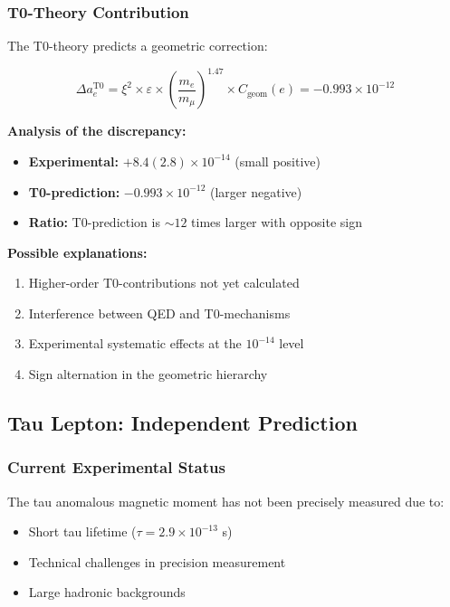 \documentclass[12pt,a4paper]{article}
\numberwithin{equation}{section}
\newcommand{\xipar}{\xi}
\newcommand{\epsilonT}{\varepsilon}
\newcommand{\Cgeom}{C_{\text{geom}}}
\begin{document}
	\subsubsection{T0-Theory Contribution}
	
	The T0-theory predicts a geometric correction:
	
	\begin{equation}
		\Delta a_e^{\text{T0}} = \xipar^2 \times \epsilonT \times \left(\frac{m_e}{m_\mu}\right)^{1.47} \times \Cgeom(e) = -0.993 \times 10^{-12}
		\label{eq:electron_t0_contribution}
	\end{equation}
	
	\textbf{Analysis of the discrepancy:}
	\begin{itemize}
		\item \textbf{Experimental:} $+8.4(2.8) \times 10^{-14}$ (small positive)
		\item \textbf{T0-prediction:} $-0.993 \times 10^{-12}$ (larger negative)
		\item \textbf{Ratio:} T0-prediction is $\sim 12$ times larger with opposite sign
	\end{itemize}
	
	\textbf{Possible explanations:}
	\begin{enumerate}
		\item Higher-order T0-contributions not yet calculated
		\item Interference between QED and T0-mechanisms
		\item Experimental systematic effects at the $10^{-14}$ level
		\item Sign alternation in the geometric hierarchy
	\end{enumerate}
	
	\subsection{Tau Lepton: Independent Prediction}
	
	\subsubsection{Current Experimental Status}
	
	The tau anomalous magnetic moment has not been precisely measured due to:
	\begin{itemize}
		\item Short tau lifetime ($\tau = 2.9 \times 10^{-13}$ s)
		\item Technical challenges in precision measurement
		\item Large hadronic backgrounds
	\end{itemize}
	
\end{document}
